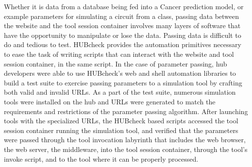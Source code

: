 \documentclass[letterpaper]{scrartcl}
\begin{document}
Whether it is data from a database being fed into a Cancer prediction model, or
example parameters for simulating a circuit from a class, passing data between
the website and the tool session container involves many layers of software
that have the opportunity to manipulate or lose the data. Passing data is
difficult to do and tedious to test.  HUBcheck provides the automation
primitives necessary to ease the task of writing scripts that can interact with
the website and tool session container, in the same script. In the case of
parameter passing, hub developers were able to use HUBcheck's web and shell
automation libraries to build a test suite to exercise passing parameters to a
simulation tool by crafting both valid and invalid URLs. As a part of the test
suite, numerous simulation tools were installed on the hub and URLs were
generated to match the requirements and restrictions of the parameter passing
algorithm. After launching tools with the specialized URLs, the HUBcheck based
scripts accessed the tool session container running the simulation tool, and
verified that the parameters were passed through the tool invocation labyrinth
that includes the web browser, the web server, the middleware, into the tool
session container, through the tool's invoke script, and to the tool where it
can be properly processed.
\end{document}
